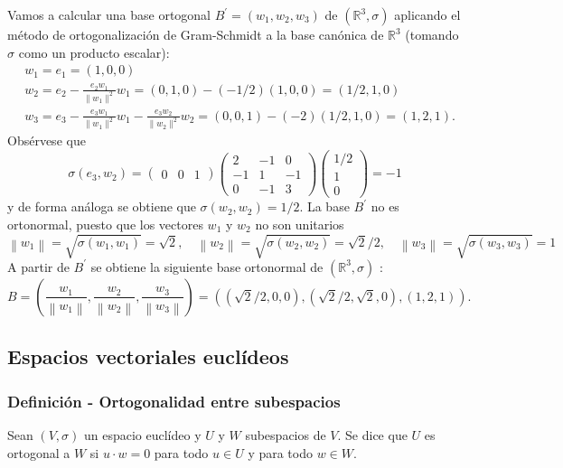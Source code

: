 \documentclass[12pt, a4paper, ones, notitlepage, openany,titlepage]{article}
\begin{document}
Vamos a calcular una base ortogonal $B^{\prime}=\left(w_{1}, w_{2}, w_{3}\right)$ de $\left(\mathbb{R}^{3}, \sigma\right)$ aplicando el método de ortogonalización de Gram-Schmidt a la base canónica de $\mathbb{R}^{3}$ (tomando $\sigma$ como un producto escalar):
$$
\begin{aligned}
	& w_{1}=e_{1}=(1,0,0) \\
	& w_{2}=e_{2}-\frac{e_{2} w_{1}}{\|w_{1}\|^2} w_{1}=(0,1,0)-(-1 / 2)(1,0,0)=(1 / 2,1,0) \\
	& w_{3}=e_{3}-\frac{e_{3} w_{1}}{\|w_{1}\|^2} w_{1}-\frac{e_{3} w_{2}}{\|w_{2}\|^2} w_{2}=(0,0,1)-(-2)(1 / 2,1,0)=(1,2,1) .
\end{aligned}
$$
Obsérvese que
$$
\sigma\left(e_{3}, w_{2}\right)=\left(\begin{array}{lll}
	0 & 0 & 1
\end{array}\right)\left(\begin{array}{rrr}
	2 & -1 & 0 \\
	-1 & 1 & -1 \\
	0 & -1 & 3
\end{array}\right)\left(\begin{array}{r}
	1 / 2 \\
	1 \\
	0
\end{array}\right)=-1
$$
y de forma análoga se obtiene que $\sigma\left(w_{2}, w_{2}\right)=1 / 2$. La base $B^{\prime}$ no es ortonormal, puesto que los vectores $w_{1}$ y $w_{2}$ no son unitarios
$$
\left\|w_{1}\right\|=\sqrt{\sigma\left(w_{1}, w_{1}\right)}=\sqrt{2}, \quad\left\|w_{2}\right\|=\sqrt{\sigma\left(w_{2}, w_{2}\right)}=\sqrt{2} / 2, \quad\left\|w_{3}\right\|=\sqrt{\sigma\left(w_{3}, w_{3}\right)}=1
$$
A partir de $B^{\prime}$ se obtiene la siguiente base ortonormal de $\left(\mathbb{R}^{3}, \sigma\right)$ :
$$
B=\left(\frac{w_{1}}{\left\|w_{1}\right\|}, \frac{w_{2}}{\left\|w_{2}\right\|}, \frac{w_{3}}{\left\|w_{3}\right\|}\right)=((\sqrt{2} / 2,0,0),(\sqrt{2} / 2, \sqrt{2}, 0),(1,2,1)) .
$$

\subsection{Espacios vectoriales euclídeos}

\subsubsection{Definición - Ortogonalidad entre subespacios}
Sean $(V, \sigma)$ un espacio euclídeo y $U$ y $W$ subespacios de $V$. Se dice que $U$ es ortogonal a $W$ si $u \cdot w=0$ para todo $u \in U$ y para todo $w \in W$.
\end{document}
